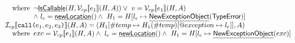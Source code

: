 \documentclass{article}
\makeatletter
\newcommand{\TT}[1]{\mbox{\texttt{#1}}}
\newcommand{\wherec}[1]{{\rm where}\begin{array}[t]{l}#1\end{array}}
\newcommand{\I}{\mathcal{I}}
\newcommand{\V}{\mathcal{V}}
\newcommand{\lbr}{\llbracket}
\newcommand{\rbr}{\rrbracket}
\newcommand{\hf}[1]{\underline{\sf #1}}
\newcommand{\exc}[1]{{\sf #1}}
\newcommand{\varloc}[1]{\##1}
\newcommand{\varprop}[1]{@#1}
\makeatother
\begin{document}
\[\begin{array}{ll}
\quad\wherec{
  \lnot\hf{IsCallable}(H,\V _{cp}\lbr e_1\rbr(H,A))   \lor\ v = \V_{cp}\lbr e_1\rbr(H,A) \\
  \land\ l_e = \hf{newLocation}()
  \land\ H_1=H[l_e\mapsto\hf{NewExceptionObject}(\exc{TypeError})] \\
} \\
\I _{cp}\lbr \TT{call}\TT{(}e_1,e_2,e_3\TT{)} \rbr(H,A)
 = (H_1[\varloc{temp}\mapsto H_1(\varloc{temp})[\varprop{exception}\mapsto l_{e}]], A) \\
\quad\wherec{
  exc = \V_{cp}\lbr e_1\rbr(H,A)
  \land\ l_e = \hf{newLocation}()
  \land\ H_1=H[l_e\mapsto\hf{NewExceptionObject}(exc)] \\
} \\
\\

\end{array}
\]
\end{document}
